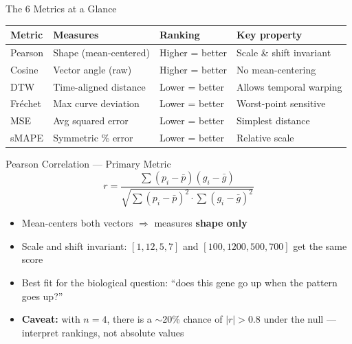 \documentclass[aspectratio=169,12pt,handout]{beamer}
\begin{document}
\begin{frame}{The 6 Metrics at a Glance}
\begin{center}
\small
\begin{tabular}{llll}
\toprule
\textbf{Metric} & \textbf{Measures} & \textbf{Ranking} & \textbf{Key property} \\
\midrule
Pearson  & Shape (mean-centered) & Higher = better & Scale \& shift invariant \\
Cosine   & Vector angle (raw)    & Higher = better & No mean-centering \\
DTW      & Time-aligned distance & Lower = better  & Allows temporal warping \\
Fr\'{e}chet & Max curve deviation   & Lower = better  & Worst-point sensitive \\
MSE      & Avg squared error     & Lower = better  & Simplest distance \\
sMAPE    & Symmetric \% error    & Lower = better  & Relative scale \\
\bottomrule
\end{tabular}
\end{center}
\end{frame}

\begin{frame}{Pearson Correlation --- Primary Metric}
$$r = \frac{\sum(p_i - \bar{p})(g_i - \bar{g})}
           {\sqrt{\sum(p_i - \bar{p})^2 \cdot \sum(g_i - \bar{g})^2}}$$

\begin{itemize}
  \item Mean-centers both vectors $\Rightarrow$ measures \textbf{shape only}
  \item Scale and shift invariant: $[1, 12, 5, 7]$ and $[100, 1200, 500, 700]$
        get the same score
  \item Best fit for the biological question: ``does this gene go up when the
        pattern goes up?''
  \item \textbf{Caveat:} with $n=4$, there is a $\sim$20\% chance of $|r|>0.8$
        under the null --- interpret rankings, not absolute values
\end{itemize}
\end{frame}
\end{document}
